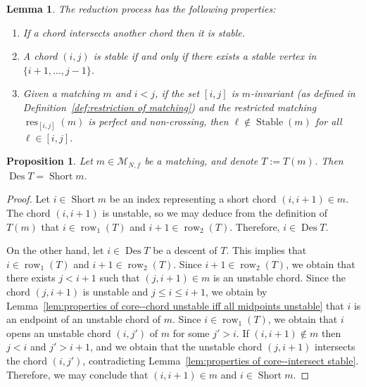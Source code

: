 \documentclass[11pt]{article}
\newtheorem{proposition}[theo]{Proposition}
\newtheorem{lemma}[theo]{Lemma}
\theoremstyle{definition}
\numberwithin{equation}{section}
\newcommand{\Des}{\operatorname{Des}}
\newcommand{\Short}{\operatorname{Short}}
\newcommand{\Stable}{\operatorname{Stable}}
\newcommand{\res}{\operatorname{res}}
\newcommand{\row}{\operatorname{row}}
\newcommand{\M}{\mathcal{M}}
\begin{document}
\begin{lemma}
\label{lem:properties of core}
    The reduction process has the following properties:
    \begin{enumerate}[label=(\arabic*), ref=\ref{lem:properties of core}\text{ (part~}\arabic*)]
        \item \label{lem:properties of core--intersect stable} If a chord intersects another chord then it is stable.
        \item \label{lem:properties of core--chord unstable iff all midpoints unstable} A chord $(i,j)$ is stable if and only if there exists a stable vertex in $\{i+1,\dots,j-1\}$.
        \item \label{lem:properties of core--perfect non-crossing unstable} Given a matching $m$ and $i < j$, if the set $[i,j]$ is $m$-invariant \textup{(}as defined in Definition~\ref{def:restriction of matching}\textup{)} and the restricted matching $\res_{[i,j]}(m)$ is perfect and non-crossing, then $\ell \notin \Stable(m)$ for all $\ell \in [i,j]$.
    \end{enumerate}
\end{lemma}

\begin{proposition}
\label{prop:F statistic preserving}
    Let $m \in \M_{N,f}$ be a matching, and denote $T := T(m)$. Then $\Des T = \Short m$.
\end{proposition}

\begin{proof}
    Let $i \in \Short m$ be an index representing a short chord $(i,i+1) \in m$. The chord $(i,i+1)$ is unstable, so we may deduce from the definition of $T(m)$ that $i \in \row_1(T)$ and $i+1 \in \row_2(T)$. Therefore, $i \in \Des T$.
    
    On the other hand, let $i \in \Des T$ be a descent of $T$. This implies that $i \in \row_1(T)$ and $i+1 \in \row_2(T)$. Since $i+1 \in \row_2(T)$, we obtain that there exists $j < i+1$ such that $(j,i+1) \in m$ is an unstable chord. Since the chord $(j,i+1)$ is unstable and $j \le i \le i+1$, we obtain by Lemma~\ref{lem:properties of core--chord unstable iff all midpoints unstable} that $i$ is an endpoint of an unstable chord of $m$. Since $i \in \row_1(T)$, we obtain that $i$ opens an unstable chord $(i,j')$ of $m$ for some $j'>i$.
    If $(i,i+1) \notin m$ then $j<i$ and $j' > i+1$, and we obtain that the unstable chord $(j,i+1)$ intersects the chord $(i,j')$, contradicting Lemma~\ref{lem:properties of core--intersect stable}. Therefore, we may conclude that $(i,i+1) \in m$ and $i \in \Short m$.
\end{proof}
\end{document}
